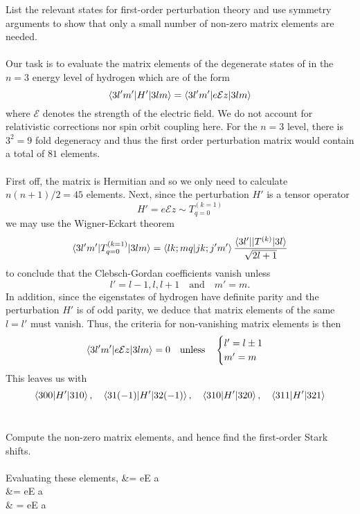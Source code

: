 \documentclass[10pt,letterpaper]{article}
\begin{document}
	\benum
		\item 
		List the relevant states for first-order perturbation theory and use symmetry arguments to show that only a small number
		of non-zero matrix elements are needed.
		\\
		\\
		Our task is to evaluate the matrix elements of the degenerate states of in the $n=3$ energy level of hydrogen
 		which are of the form
 		\[
			\braket{3l'm'|H'|3lm} = \braket{3l'm'|e\mathcal{E}z|3lm}
		\]
		where $\mathcal E$ denotes the strength of the electric field. We do not account for relativistic corrections nor 
		spin orbit coupling here. For the $n=3$ level, there is $3^2 = 9$ fold degeneracy and thus the first order
		perturbation matrix would contain a total of $81$ elements. 
		\\
		\\ 
		First off, the matrix is Hermitian and so we only need to calculate $n(n+1)/2 = 45$ elements. Next, since the 
		perturbation $H'$ is a tensor operator
		\[
			H' = e\mathcal Ez \sim T_{q=0}^{(k=1)}
		\]
		we may use the Wigner-Eckart theorem
		\[
			\braket{3l'm'|T_{q=0}^{(k=1)}|3lm} = \braket{lk;mq|jk;j'm'}\frac{\braket{3l'||T^{(k)}|3l}}{\sqrt{2l+1}}
		\]
		to conclude that the Clebsch-Gordan coefficients vanish unless
		\[
			l' = l-1,l,l+1\quad \text{and} \quad m' = m.
		\]
		In addition, since the eigenstates of hydrogen have definite parity and the perturbation $H'$ is of odd parity,
		we deduce that matrix elements of the same $l=l'$ must vanish. Thus, the criteria for non-vanishing matrix
		elements is then
		\[
			\braket{3l'm'|e\mathcal{E}z|3lm} = 0\quad\text{unless}\quad 
			\begin{cases} l'=l\pm1\\m'=m \end{cases}
		\]
		This leaves us with
		\[
			\braket{300|H'|310},\quad \braket{31(-1)|H'|32(-1)},\quad \braket{310|H'|320},\quad \braket{311|H'|321}
		\]
		\\
		\item
		Compute the non-zero matrix elements, and hence find the first-order Stark shifts.
		\\
		\\
		Evaluating these elements,
		\ba
			 &= e\mathcal E a
			\\
			  &=  e\mathcal E a
			 \\
			  & =  e\mathcal E a
			 \\
\end{document}
